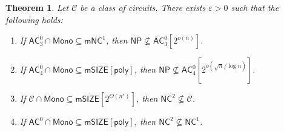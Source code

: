 \documentclass[10pt,a4paper]{article}
\newtheorem{theorem}{Theorem}[section]
\newcommand{\eps}{\varepsilon}
\newcommand{\poly}{\mathsf{poly}}
\newcommand{\complexityfont}[1]{\mathsf{#1}}
\newcommand{\monclass}[1]{\mathsf{m}#1}
\def\mNC          {\monclass{\NC}}
\def\NP           {\complexityfont{NP}}
\def\AC           {\complexityfont{AC}}
\def\NC           {\complexityfont{NC}}
\def\SIZE         {\complexityfont{SIZE}}
\def\mSIZE        {\monclass{\SIZE}}
\newcommand{\semMon}[1]{#1 \cap \monfns}
\newcommand{\monfns}{\mathsf{Mono}}
\def\sseq{\subseteq}
\def\calc{{\mathcal C}}
\begin{document}
\begin{theorem}
    \label{cor:xor-sat-ag}
    Let $\calc$ be 
    a class of circuits.
    There exists $\eps > 0$ such that
    the following holds:
    \begin{enumerate}
        \item 
            \label{item:ac03}
            If $\semMon{\AC^0_3} \subseteq \mNC^1$,
            then 
            $\NP 
            \not\sseq
            \AC^0_3[2^{o(n)}]$.
        \item 
            \label{item:ac04}
            If 
            $\semMon{\AC^0_4} \subseteq \mSIZE[\poly]$,
            then 
            $\NP 
            \not\sseq
            \AC^0_4[ 2^{o( \sqrt{n}/\log n )} ]$.
        \item 
            \label{item:subexp}
            If $\semMon{\calc} \sseq \mSIZE[2^{O(n^\eps)}]$,
            then 
            $\NC^2 
            \not\sseq
            \calc$.
        \item 
            \label{item:ac-poly}
            If 
            $\semMon{\AC^0} 
            \sseq 
            \mSIZE[\poly]$,
            then
            $\NC^2 
            \not\sseq
            \NC^1$.
    \end{enumerate}
\end{theorem}
\end{document}
